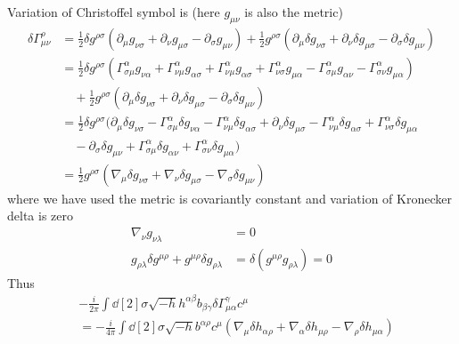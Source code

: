 \begin{enumerate}[label=(\alph*)]
		Variation of Christoffel symbol is (here $g_{\mu\nu}$ is also the metric)
		\begin{align*}
			\delta \Gamma^\rho_{\mu\nu} &= \frac{1}{2} \delta g^{\rho\sigma} (\partial_\mu g_{\nu\sigma} + \partial_\nu g_{\mu\sigma} - \partial_\sigma g_{\mu\nu}) + \frac{1}{2}  g^{\rho\sigma} (\partial_\mu \delta g_{\nu\sigma} + \partial_\nu \delta g_{\mu\sigma} - \partial_\sigma \delta g_{\mu\nu}) \\
												 &= \frac{1}{2} \delta g^{\rho\sigma} (\Gamma^\alpha_{ \sigma \mu} g_{\nu \alpha} + \Gamma^\alpha_{ \nu \mu} g_{\alpha \sigma} + \Gamma^\alpha_{\nu \mu} g_{\alpha\sigma} + \Gamma^\alpha_{\nu\sigma} g_{\mu \alpha} - \Gamma^\alpha_{\sigma\mu} g_{\alpha \nu} - \Gamma^\alpha_{\sigma\nu} g_{\mu \alpha} ) \\
												 &\quad + \frac{1}{2}  g^{\rho\sigma} (\partial_\mu \delta g_{\nu\sigma} + \partial_\nu \delta g_{\mu\sigma} - \partial_\sigma \delta g_{\mu\nu}) \\
												 &= \frac{1}{2} \delta g^{\rho\sigma} (\partial_\mu \delta g_{\nu\sigma} - \Gamma^\alpha_{ \sigma \mu} \delta g_{\nu \alpha} - \Gamma^\alpha_{ \nu \mu}  \delta g_{\alpha \sigma} + \partial_\nu \delta g_{\mu\sigma} - \Gamma^\alpha_{\nu \mu} \delta g_{\alpha\sigma} + \Gamma^\alpha_{\nu\sigma} \delta g_{\mu \alpha} \\
												 &\quad - \partial_\sigma \delta g_{\mu\nu} + \Gamma^\alpha_{\sigma\mu} \delta g_{\alpha \nu} + \Gamma^\alpha_{\sigma\nu} \delta g_{\mu \alpha}) \\
												 &= \frac{1}{2}  g^{\rho\sigma}(\nabla_\mu \delta g_{\nu\sigma} + \nabla_\nu \delta g_{\mu\sigma} - \nabla_\sigma \delta g_{\mu\nu})
		\end{align*}
		where we have used the metric is covariantly constant and variation of Kronecker delta is zero
		\begin{align}
			\nabla_\nu g_{\nu \lambda} &= 0 \label{math:g_nabla}\\
			g_{\rho\lambda} \delta g^{\mu\rho} + g^{\mu\rho} \delta g_{\rho\lambda} &= \delta (g^{\mu\rho} g_{\rho\lambda}) = 0 \label{math:minus_delta}
		\end{align}
		Thus
		\begin{align*}
			&- \frac{i}{2\pi} \int \dd[2]{\sigma} \sqrt{-h} h^{\alpha \beta} b_{\beta \gamma} \delta \Gamma^\gamma_{\mu \alpha} c^\mu \\
			&= - \frac{i}{4\pi} \int \dd[2]{\sigma} \sqrt{-h}  b^{\alpha \rho} c^\mu   (\nabla_\mu \delta h_{\alpha \rho} + \nabla_\alpha \delta h_{\mu\rho} - \nabla_\rho \delta h_{\mu\alpha})

\end{align*}
\end{enumerate}
